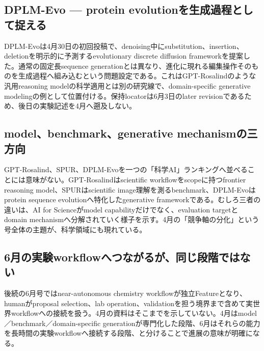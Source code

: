 \begingroup\raggedright
\subsection{DPLM-Evo — protein evolutionを生成過程として捉える}
\par\endgroup

DPLM-Evoは4月30日の初回投稿で、denoising中にsubstitution、insertion、deletionを明示的に予測するevolutionary discrete diffusion frameworkを提案した。通常の固定長sequence generationとは異なり、進化に現れる編集操作そのものを生成過程へ組み込むという問題設定である。これはGPT-Rosalindのような汎用reasoning modelの科学適用とは別の研究線で、domain-specific generative modelingの例として位置付ける。保持locatorは6月3日のlater revisionであるため、後日の実験記述を4月へ遡及しない。\autocite{src-f0bb84fcd319}


\begingroup\raggedright
\subsection{model、benchmark、generative mechanismの三方向}
\par\endgroup

GPT-Rosalind、SPUR、DPLM-Evoを一つの「科学AI」ランキングへ並べることには意味がない。GPT-Rosalindはscientific workflowをscopeに持つfrontier reasoning model、SPURはscientific image理解を測るbenchmark、DPLM-Evoはprotein sequence evolutionへ特化したgenerative frameworkである。むしろ三者の違いは、AI for Scienceがmodel capabilityだけでなく、evaluation targetとdomain mechanismへ分解されていく様子を示す。4月の「競争軸の分化」という号全体の主題が、科学領域にも現れている。\autocite{src-078f0d540d88,src-7ae707d75c4b,src-f0bb84fcd319}


\begingroup\raggedright
\subsection{6月の実験workflowへつながるが、同じ段階ではない}
\par\endgroup

後続の6月号ではnear-autonomous chemistry workflowが独立Featureとなり、humanがproposal selection、lab operation、validationを担う境界まで含めて実世界workflowへの接続を扱う。4月の資料はそこまでを示していない。4月はmodel／benchmark／domain-specific generationが専門化した段階、6月はそれらの能力を長時間の実験workflowへ接続する段階、と分けることで進展の意味が明確になる。\autocite{src-078f0d540d88,src-7ae707d75c4b,src-f0bb84fcd319}


